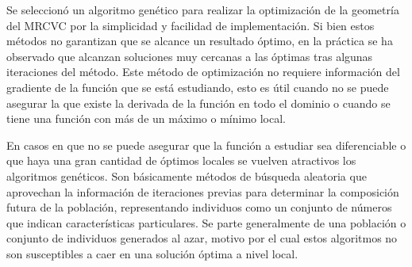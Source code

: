 


%
Se seleccionó un algoritmo genético para realizar la optimización de la
geometría del MRCVC por la simplicidad y facilidad de implementación.
%
Si bien estos métodos no garantizan que se alcance un resultado óptimo, en la
práctica\cite{goldberg}\cite{shi} se ha observado que alcanzan soluciones muy
cercanas a las óptimas tras algunas iteraciones del método.
%
Este método de optimización no requiere información del gradiente de la función
que se está estudiando, esto es útil cuando no se puede asegurar la que existe
la derivada de la función en todo el dominio o cuando se tiene una función con
más de un máximo o mínimo local.
%

%


En casos en que no se puede asegurar que la función a estudiar sea
diferenciable o que haya una gran cantidad de óptimos locales se vuelven
atractivos los algoritmos genéticos.
%
Son básicamente métodos de búsqueda aleatoria que aprovechan la información de
iteraciones previas para determinar la composición futura de la población,
representando individuos como un conjunto de números que indican
características particulares.
%
Se parte generalmente de una población o conjunto de individuos generados al
azar, motivo por el cual estos algoritmos no son susceptibles a caer en una
solución óptima a nivel local.


